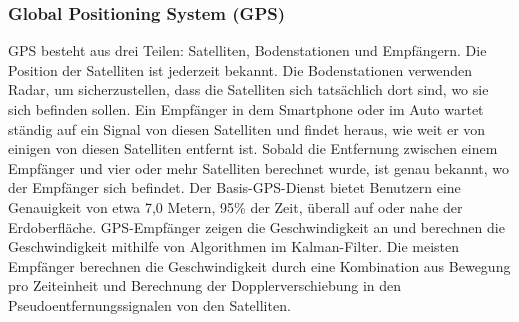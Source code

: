 %
%
%
%
%
%
%
%
\subsubsection{Global Positioning System (GPS)}

GPS besteht aus drei Teilen: Satelliten, Bodenstationen und Empfängern. Die Position der Satelliten ist jederzeit bekannt. Die Bodenstationen verwenden Radar, um sicherzustellen, dass die Satelliten sich tatsächlich dort sind, wo sie sich befinden sollen.
Ein Empfänger in dem Smartphone oder im Auto wartet ständig auf ein Signal von diesen Satelliten und findet heraus, wie weit er von einigen von diesen Satelliten entfernt ist. Sobald die Entfernung zwischen einem Empfänger und vier oder mehr Satelliten berechnet wurde, ist genau bekannt, wo der Empfänger sich befindet. Der Basis-GPS-Dienst bietet Benutzern eine Genauigkeit von etwa 7,0 Metern, 95\% der Zeit, überall auf oder nahe der Erdoberfläche. GPS-Empfänger zeigen die Geschwindigkeit an und berechnen die Geschwindigkeit mithilfe von Algorithmen im Kalman-Filter. Die meisten Empfänger berechnen die Geschwindigkeit durch eine Kombination aus Bewegung pro Zeiteinheit und Berechnung der Dopplerverschiebung in den Pseudoentfernungssignalen von den Satelliten.\cite{Nasa2019}\cite{FAAGPS}\cite{YeazelGPS}

